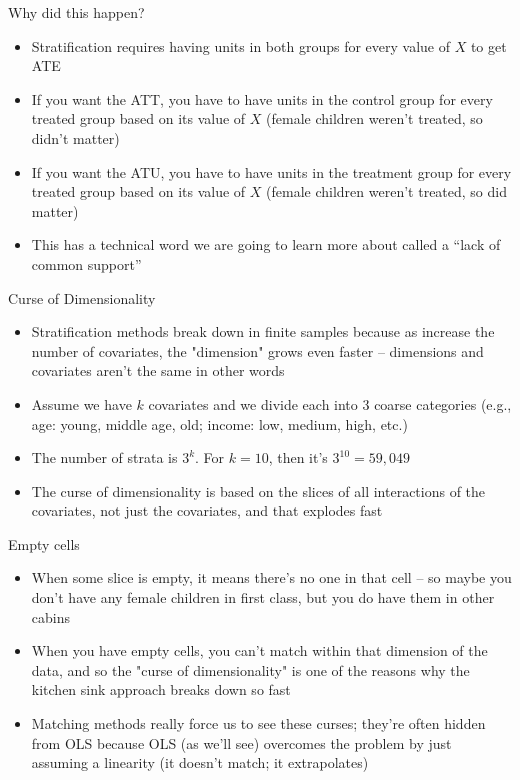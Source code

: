 \documentclass{beamer}
\begin{document}
\begin{frame}{Why did this happen?}

\begin{itemize}

\item Stratification requires having units in both groups for every value of $X$ to get ATE
\item If you want the ATT, you have to have units in the control group for every treated group based on its value of $X$ (female children weren't treated, so didn't matter)
\item If you want the ATU, you have to have units in the treatment group for every treated group based on its value of $X$ (female children weren't treated, so did matter)
\item This has a technical word we are going to learn more about called a ``lack of common support''
\end{itemize}

\end{frame}

\begin{frame}{Curse of Dimensionality}
	
	\begin{itemize}
	\item Stratification methods break down in finite samples because as increase the number of covariates, the "dimension" grows even faster -- dimensions and covariates aren't the same in other words
	\item Assume we have $k$ covariates and we divide each into 3 coarse categories (e.g., age: young, middle age, old; income: low, medium, high, etc.)
	\item The number of strata is $3^k$. For $k=10$, then it's $3^{10}=59,049$
	\item The curse of dimensionality is based on the slices of all interactions of the covariates, not just the covariates, and that explodes fast
	\end{itemize}
\end{frame}

\begin{frame}{Empty cells}
	
	\begin{itemize}
	\item When some slice is empty, it means there's no one in that cell -- so maybe you don't have any female children in first class, but you do have them in other cabins
	\item When you have empty cells, you can't match within that dimension of the data, and so the "curse of dimensionality" is one of the reasons why the kitchen sink approach breaks down so fast
	\item Matching methods really force us to see these curses; they're often hidden from OLS because OLS (as we'll see) overcomes the problem by just assuming a linearity (it doesn't match; it extrapolates)
	\end{itemize}
\end{frame}	
\end{document}
